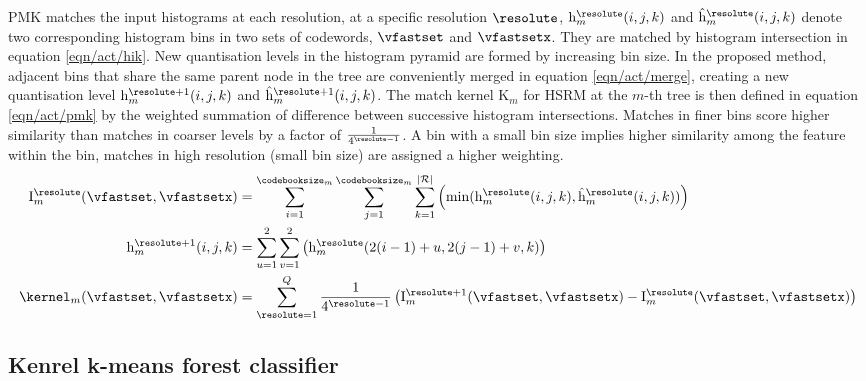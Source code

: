 PMK matches the input histograms at each resolution, at a specific resolution $\resolute$, $\mathrm{h}^\resolute_{m}(i,j,k)$ and $\mathrm{\hat{h}}^\resolute_{m}(i,j,k)$ denote two corresponding histogram bins in two sets of codewords, $\vfastset$ and $\vfastsetx$. They are matched by histogram intersection in equation \ref{eqn/act/hik}. New quantisation levels in the histogram pyramid are formed by increasing bin size. In the proposed method, adjacent bins that share the same parent node in the tree are conveniently merged in equation \ref{eqn/act/merge}, creating a new quantisation level $\mathrm{h}^{\resolute+1}_m(i,j,k)$ and $\mathrm{\hat{h}}^{\resolute+1}_m(i,j,k)$. The match kernel $\mathrm{K}_m$ for HSRM at the $m$-th tree is then defined in equation \ref{eqn/act/pmk} by the weighted summation of difference between successive histogram intersections. Matches in finer bins score higher similarity than matches in coarser levels by a factor of $\frac{1}{4^{\resolute-1}}$. A bin with a small bin size implies higher similarity among the feature within the bin, matches in high resolution (small bin size) are assigned a higher weighting.  
\begin{align}
	\label{eqn/act/hik}
	\mathrm{I}_{m}^\resolute(\vfastset,\vfastsetx) & =  \displaystyle\sum_{i=1}^{\codebooksize_m}\sum_{j=1}^{\codebooksize_m}\sum_{k=1}^{|\mathcal{R}|} \left( \min(\mathrm{h}^{\resolute}_m(i,j,k), \mathrm{\hat{h}}^{\resolute}_m(i,j,k)) \right)\\
	\label{eqn/act/merge}
	\mathrm{h}^{\resolute+1}_m(i,j,k) & =  \displaystyle\sum_{u=1}^{2}\sum_{v=1}^{2} \left( \mathrm{h}^{\resolute}_m(2(i-1)+u,2(j-1)+v,k) \right)\\
	\label{eqn/act/pmk}
	\kernel_m(\vfastset,\vfastsetx) & =  \displaystyle\sum_{\resolute = 1}^{Q}\frac{1}{4^{\resolute-1}} \left( \mathrm{I}_{m}^{\resolute+1}(\vfastset,\vfastsetx) - \mathrm{I}_{m}^{\resolute}(\vfastset,\vfastsetx) \right)
\end{align}

\subsection{Kenrel k-means forest classifier}

